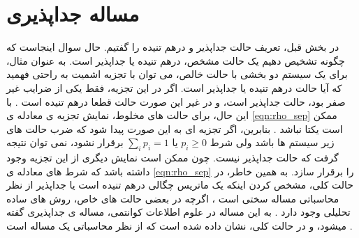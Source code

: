 \section{مساله جداپذیری}

در بخش قبل، تعریف حالت جداپذیر و درهم تنیده را گفتیم. حال سوال اینجاست که چگونه تشخیص دهیم یک حالت مشخص، درهم تنیده یا جداپذیر است.
به عنوان مثال، برای یک سیستم دو بخشی با حالت خالص،‌ می توان با تجزیه اشمیت
به راحتی فهمید که آیا حالت درهم تنیده یا جداپذیر است.
اگر در این تجزیه، فقط یکی از ضرایب غیر صفر بود، حالت جداپذیر است، و در غیر این صورت حالت قطعا درهم تنیده است
\cite{Ekert1995,Sciara2017}.
با این حال، برای حالت های مخلوط، نمایش تجزیه ی معادله ی
\ref{eqn:rho_sep}
ممکن است یکتا نباشد
\cite{Ekert1995,Sciara2017}.
بنابرین، اگر تجزیه ای به این صورت پیدا شود که ضرب حالت های زیر سیستم ها باشد ولی شرط
$p_i \geq 0$
یا
$\sum_i p_i =1$
برقرار نشود، نمی توان نتیجه گرفت که حالت جداپذیر نیست. چون ممکن است نمایش دیگری از این تجزیه وجود داشته باشد که شرط های معادله ی
\ref{eqn:rho_sep}
را برقرار سازد.
به همین خاطر، در حالت کلی، مشخص کردن اینکه یک ماتریس چگالی درهم تنیده است یا جداپذیر از نظر محاسباتی مساله سختی است
\cite{Vedral1997}،
اگرچه در بعضی حالت های خاص،‌ روش های ساده تحلیلی وجود دارد
\cite{horodecki_1996}.
به این مساله در علوم اطلاعات کوانتمی، مساله ی جداپذیری
گفته میشود،
و در حالت کلی، نشان داده شده است که از نظر محاسباتی یک مساله
است
\cite{gharibia_2010}.
